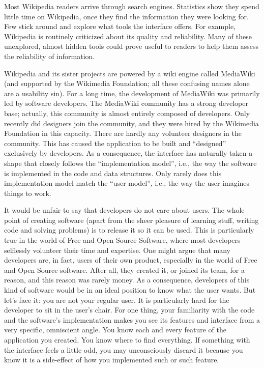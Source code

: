 Most Wikipedia readers arrive through search engines. Statistics show they spend
little time on Wikipedia, once they find the information they were looking for.
Few stick around and explore what tools the interface offers. For example,
Wikipedia is routinely criticized about its quality and reliability. Many of
these unexplored, almost hidden tools could prove useful to readers to help them
assess the reliability of information.

Wikipedia and its sister projects are powered by a wiki engine called MediaWiki
(and supported by the Wikimedia Foundation; all these confusing names alone are
a usability sin). For a long time, the development of MediaWiki was primarily
led by software developers. The MediaWiki community has a strong developer base;
actually, this community is almost entirely composed of developers. Only
recently did designers join the community, and they were hired by the Wikimedia
Foundation in this capacity. There are hardly any volunteer designers in the
community. This has caused the application to be built and ``designed''
exclusively by developers. As a consequence, the interface has naturally taken a
shape that closely follows the ``implementation model'', i.e., the way the
software is implemented in the code and data structures. Only rarely does this
implementation model match the ``user model'', i.e., the way the user imagines
things to work.

It would be unfair to say that developers do not care about users. The whole
point of creating software (apart from the sheer pleasure of learning stuff,
writing code and solving problems) is to release it so it can be used. This is
particularly true in the world of Free and Open Source Software, where most
developers selflessly volunteer their time and expertise. One might argue that
many developers are, in fact, users of their own product, especially in the
world of Free and Open Source software. After all, they created it, or joined
its team, for a reason, and this reason was rarely money. As a consequence,
developers of this kind of software would be in an ideal position to know what
the user wants.
\newline
But let's face it: you are not your regular user.
\newline
It is particularly hard for the developer to sit in the user's chair. For one
thing, your familiarity with the code and the software's implementation makes
you see its features and interface from a very specific, omniscient angle. You
know each and every feature of the application you created. You know where to
find everything. If something with the interface feels a little odd, you may
unconsciously discard it because you know it is a side-effect of how you
implemented such or such feature.


